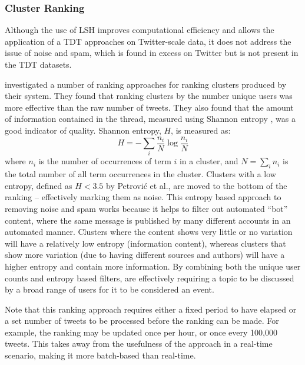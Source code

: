 \subsubsection{Cluster Ranking}
Although the use of LSH improves computational efficiency and allows the application of a TDT approaches on Twitter-scale data, it does not address the issue of noise and spam, which is found in excess on Twitter but is not present in the TDT datasets.

\cite{Petrovic:2010:SFS:1857999.1858020} investigated a number of ranking approaches for ranking clusters produced by their system.
They found that ranking clusters by the number unique users was more effective than the raw number of tweets.
They also found that the amount of information contained in the thread, measured using Shannon entropy \citep{Shannon:2001:MTC:584091.584093}, was a good indicator of quality.
Shannon entropy, $H$, is measured as:
\begin{displaymath}
	H = -\sum_i{\frac{n_i}{N} \log \frac{n_i}{N}}
\end{displaymath}
where $n_i$ is the number of occurrences of term $i$ in a cluster,	and $N = \sum_i{n_i}$ is the total number of all term occurrences in the cluster.
Clusters with a low entropy, defined as $H < 3.5$ by Petrović et al., are moved to the bottom of the ranking -- effectively marking them as noise.
This entropy based approach to removing noise and spam works because it helps to filter out automated ``bot'' content, where the same message is published by many different accounts in an automated manner.
Clusters where the content shows very little or no variation will have a relatively low entropy (information content), whereas clusters that show more variation (due to having different sources and authors) will have a higher entropy and contain more information.
By combining both the unique user counts and entropy based filters, \cite{Petrovic:2010:SFS:1857999.1858020} are effectively requiring a topic to be discussed by a broad range of users for it to be considered an event.

Note that this ranking approach requires either a fixed period to have elapsed or a set number of tweets to be processed before the ranking can be made.
For example, the ranking may be updated once per hour, or once every 100,000 tweets.
This takes away from the usefulness of the approach in a real-time scenario, making it more batch-based than real-time.

